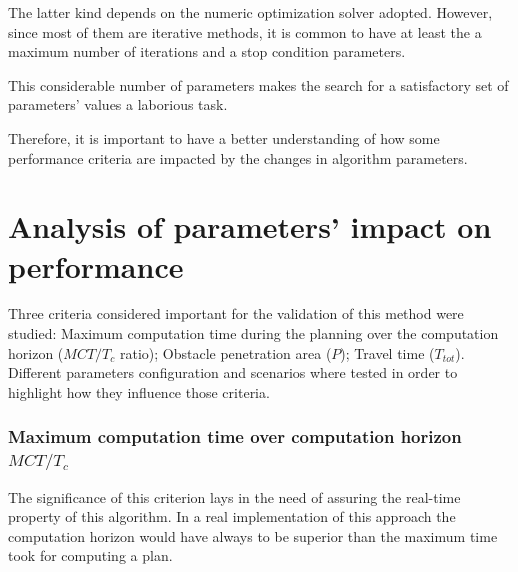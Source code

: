 The latter kind depends on the numeric optimization solver adopted.
However, since most of them are iterative methods, it is common
to have at least the a maximum number of iterations and a stop condition parameters.


This considerable number of parameters
makes the search for a
satisfactory set of parameters' values a laborious task.

Therefore, it is important to have a better understanding of how some
performance criteria are impacted by the changes in algorithm
parameters.

\section{Analysis of parameters' impact on performance}

Three criteria considered important for the validation of this method were studied: {Maximum computation time} during the planning over the computation horizon ($MCT/T_c$ 
ratio); Obstacle penetration area ($P$); Travel time ($T_{tot}$).
Different parameters configuration and scenarios where tested in order to highlight
how they influence those criteria.
%
%
%
%
%

\subsubsection{Maximum computation time over computation horizon $MCT/T_c$}

The significance of this criterion lays in the need of assuring the 
real-time property of this algorithm.
In a real implementation of this approach the computation horizon would have 
always to be superior than the
maximum time took for computing a plan.

